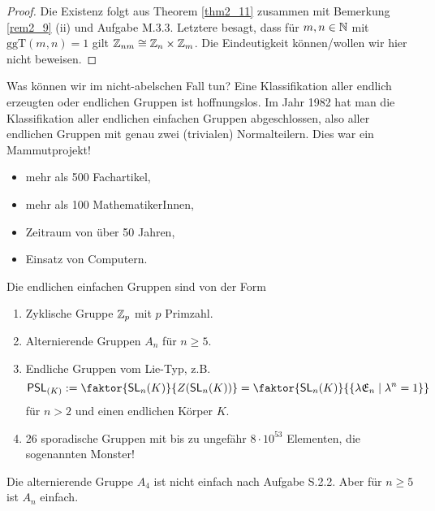\begin{proof}
	Die Existenz folgt aus Theorem \ref{thm2_11} zusammen mit Bemerkung \ref{rem2_9} (ii) und Aufgabe M.3.3. Letztere besagt, dass für $m, n \in \mathbb{N}$ mit $\mathrm{ggT}(m,n) = 1$ gilt $\mathbb{Z}_{nm} \cong \mathbb{Z}_n \times \mathbb{Z}_m$. Die Eindeutigkeit können/wollen wir hier nicht beweisen.
\end{proof}
Was können wir im nicht-abelschen Fall tun? Eine Klassifikation aller endlich erzeugten oder endlichen Gruppen ist hoffnungslos. Im Jahr 1982 hat man die Klassifikation aller endlichen einfachen Gruppen abgeschlossen, also aller endlichen Gruppen mit genau zwei (trivialen) Normalteilern. Dies war ein Mammutprojekt!
\begin{itemize}
	\item mehr als 500 Fachartikel,
	\item mehr als 100 MathematikerInnen,
	\item Zeitraum von über 50 Jahren,
	\item Einsatz von Computern.
\end{itemize}
Die endlichen einfachen Gruppen sind von der Form
\begin{enumerate}[label=(\arabic*)]
	\item Zyklische Gruppe $\mathbb{Z}_p$ mit $p$ Primzahl.
	\item Alternierende Gruppen $A_n$ für $n \geq 5$.
	\item Endliche Gruppen vom Lie-Typ, z.B.
	\[\mathsf{PSL}_{(K)} := \faktor{\SL_n(K)}{Z(\SL_n(K))} = \faktor{\SL_n(K)}{\{\lambda \mat{E}_n \mid \lambda^n = 1\}}\]
	für $n > 2$ und einen endlichen Körper $K$.
	\item 26 sporadische Gruppen mit bis zu ungefähr $8 \cdot 10^{53}$ Elementen, die sogenannten Monster!
\end{enumerate}
\begin{beispiel}\label{beispiel2_13}
	Die alternierende Gruppe $A_4$ ist nicht einfach nach Aufgabe S.2.2. Aber für $n \geq 5$ ist $A_n$ einfach.
\end{beispiel}
